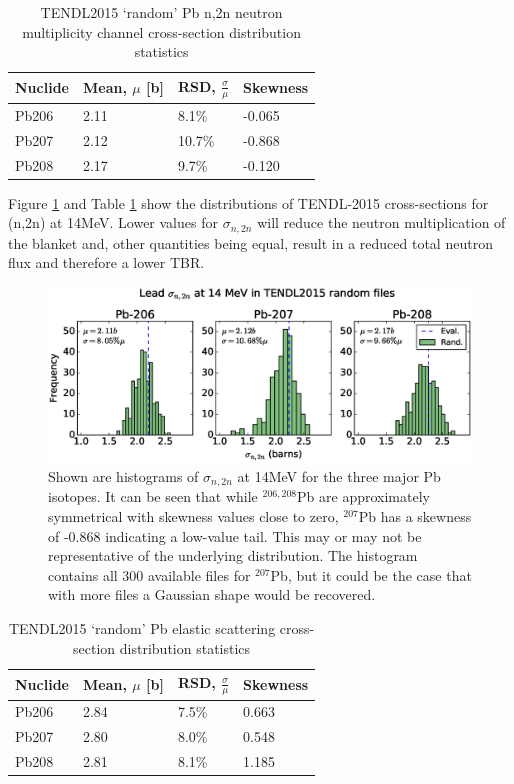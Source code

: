 \begin{table}[ht]
  \footnotesize
  \centering 
  \begin{tabular}{llll}
    \toprule
    Nuclide & Mean, $\mu$ [b] & RSD, $\frac{\sigma}{\mu}$ & Skewness \\
    \midrule
    Pb206 & 2.11 & 8.1\% & -0.065 \\
    Pb207 & 2.12 & 10.7\% & -0.868 \\
    Pb208 & 2.17 & 9.7\% & -0.120 \\
    \bottomrule
  \end{tabular}
  \caption{TENDL2015 `random' Pb n,2n neutron multiplicity channel cross-section distribution statistics}
  \label{table:n2n} %
\end{table}

Figure \ref{fig:tendl_n2n} and Table \ref{table:n2n} show the distributions of TENDL-2015 cross-sections for (n,2n) at 14MeV. Lower values for $\sigma_{n,2n}$ will reduce the neutron multiplication of the blanket and, other quantities being equal, result in a reduced total neutron flux and therefore a lower TBR.

\begin{figure}[ht]
	\includegraphics[width=\textwidth]{pb_tendl_n2n_hist}
	\caption{Shown are histograms of $\sigma_{n,2n}$ at 14MeV for the three major Pb isotopes. It can be seen that while $^{206,208}$Pb are approximately symmetrical with skewness values close to zero, $^{207}$Pb has a skewness of -0.868 indicating a low-value tail. This may or may not be representative of the underlying distribution. The histogram contains all 300 available files for $^{207}$Pb, but it could be the case that with more files a Gaussian shape would be recovered.}
	\label{fig:tendl_n2n}
\end{figure}

\begin{table}[ht]
  \footnotesize
  \centering 
  \begin{tabular}{llll}
    \toprule
    Nuclide & Mean, $\mu$ [b] & RSD, $\frac{\sigma}{\mu}$ & Skewness \\
    \midrule
    Pb206 & 2.84 & 7.5\% & 0.663 \\
    Pb207 & 2.80 & 8.0\% & 0.548 \\
    Pb208 & 2.81 & 8.1\% & 1.185 \\
    \bottomrule
  \end{tabular}
  \caption{TENDL2015 `random' Pb elastic scattering cross-section distribution statistics}
  \label{table:nel}
\end{table}

